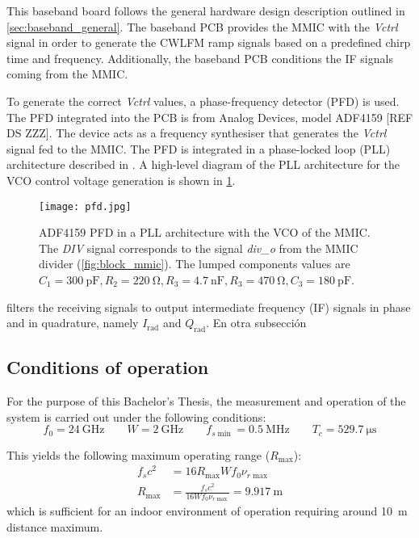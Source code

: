 This baseband board follows the general hardware design description outlined in \cref{sec:baseband_general}. The baseband PCB provides the MMIC with the \textit{Vctrl} signal in order to generate the CWLFM ramp signals based on a predefined chirp time and frequency. Additionally, the baseband PCB conditions the IF signals coming from the MMIC.

To generate the correct \textit{Vctrl} values, a phase-frequency detector (PFD) is used. The PFD integrated into the PCB is from Analog Devices, model ADF4159 [REF DS ZZZ]. The device acts as a frequency synthesiser that generates the \textit{Vctrl} signal fed to the MMIC. The PFD is integrated in a phase-locked loop (PLL) architecture described in \cite{Sardinero2022}. A high-level diagram of the PLL architecture for the VCO control voltage generation is shown in \cref{fig:pfd_pll}.

\begin{figure}[ht]
	\centering
	\texttt{[image: pfd.jpg]}
	\caption{ADF4159 PFD in a PLL architecture with the VCO of the MMIC. The \textit{DIV} signal corresponds to the signal \textit{div\_o} from the MMIC divider (\cref{fig:block_mmic}). The lumped components values are $C_1=\SI{300}{\pico\farad}, R_2=\SI{220}{\ohm}, R_3=\SI{4.7}{\nano\farad},R_3=\SI{470}{\ohm}, C_3=\SI{180}{\pico\farad}$. \cite{Sardinero2022} \label{fig:pfd_pll}}
\end{figure}
 filters the receiving signals to output intermediate frequency (IF) signals in phase and in quadrature, namely $I_{\mathrm{rad}}$ and $Q_{\mathrm{rad}}$.
En otra subsección

\subsection{Conditions of operation}
For the purpose of this Bachelor's Thesis, the measurement and operation of the system is carried out under the following conditions:
\begin{equation} \label{eq:if_conditions}
	f_0 = \SI{24}{\giga\hertz} \qquad W = \SI{2}{\giga\hertz} \qquad f_{s\min} = \SI{0.5}{\mega\hertz} \qquad T_c = \SI{529.7}{\micro\second}
\end{equation}

This yields the following maximum operating range ($R_{\max}$):
\begin{align}
	f_s c^2 &= 16 R_{\max}W f_0 \nu_{r\max} \\
	R_{\max} &= \frac{f_s c^2}{16 W f_0 \nu_{r\max}} = \SI{9.917}{\meter}
\end{align}
which is sufficient for an indoor environment of operation requiring around \SI{10}{\meter} distance maximum.

